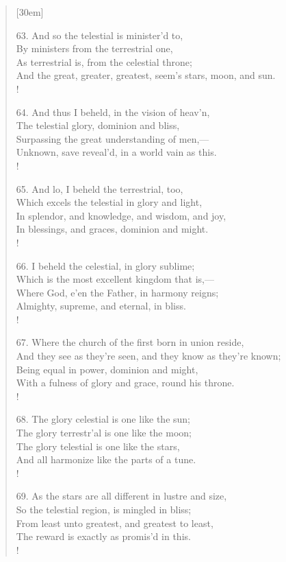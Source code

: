 \begin{verse}[30em]
\begin{altverse}
				63. And so the telestial is minister'd to, \\ 
				By ministers from the terrestrial one, \\ 
				As terrestrial is, from the celestial throne; \\ 
				And the great, greater, greatest, seem's stars, moon, and sun. \\!
				 
				64. And thus I beheld, in the vision of heav'n, \\ 
				The telestial glory, dominion and bliss, \\ 
				Surpassing the great understanding of men,--- \\ 
				Unknown, save reveal'd, in a world vain as this. \\!
				 
				65. And lo, I beheld the terrestrial, too, \\ 
				Which excels the telestial in glory and light, \\ 
				In splendor, and knowledge, and wisdom, and joy, \\ 
				In blessings, and graces, dominion and might. \\!
				 
				66. I beheld the celestial, in glory sublime; \\ 
				Which is the most excellent kingdom that is,--- \\ 
				Where God, e'en the Father, in harmony reigns; \\ 
				Almighty, supreme, and eternal, in bliss. \\!
				 
				67. Where the church of the first born in union reside, \\ 
				And they see as they're seen, and they know as they're known; \\ 
				Being equal in power, dominion and might, \\ 
				With a fulness of glory and grace, round his throne. \\!
				 
				68. The glory celestial is one like the sun; \\ 
				The glory terrestr'al is one like the moon; \\ 
				The glory telestial is one like the stars, \\ 
				And all harmonize like the parts of a tune. \\!
				 
				69. As the stars are all different in lustre and size, \\ 
				So the telestial region, is mingled in bliss; \\ 
				From least unto greatest, and greatest to least, \\ 
				The reward is exactly as promis'd in this. \\!
				 

\end{altverse}
\end{verse}
